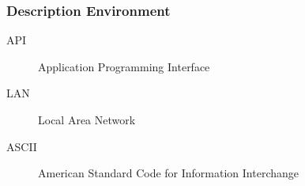 \begin{frame}\frametitle{Description Environment}

\begin{description}
\item[API] Application Programming Interface
\item[LAN] Local Area Network
\item[ASCII] American Standard Code for Information Interchange
\end{description}

\end{frame}
